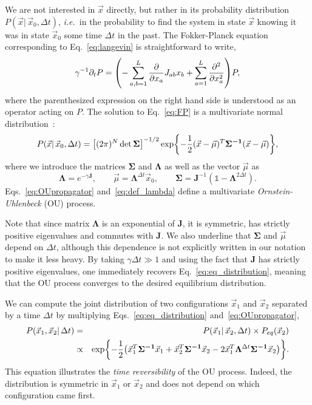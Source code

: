 \documentclass[preprint,amsmath,amssymb,superscriptaddress,showpacs,pre]{revtex4-1}
\let\originalleft\left
\let\originalright\right
\renewcommand{\left}{\mathopen{}\mathclose\bgroup\originalleft}
\renewcommand{\right}{\aftergroup\egroup\originalright}
\newcommand{\ie}{\emph{i.e.}}
\def\vx{\vec x}
\newcommand{\Lam}{\bm{\Lambda}}
\newcommand{\Sig}{\bm{\Sigma}}
\newcommand{\curlynormalpar}[1]{\exp\left\{-\frac{1}{2}\left( #1 \right)\right\}}
\newcommand{\curlynormal}[1]{\exp\left\{-\frac{1}{2} #1 \right\}}
\newcommand{\iSig}{\bm{\Sigma^{-1}}}
\begin{document}
We are not interested in $\vx$ directly, but rather in its probability distribution $P(\vx\vert\,\vx_0,\Delta t)$, \ie~in the probability to find the system in state $\vx$ knowing it was in state $\vx_0$ some time $\Delta t$ in the past. 
The Fokker-Planck equation corresponding to Eq.~\eqref{eq:langevin} is straightforward to write, 
\begin{equation}
	\gamma^{-1} \partial_t P = \left(-\sum_{a,b=1}^L\frac{\partial}{\partial x_a} J_{ab}x_b + \sum_{a=1}^L\frac{\partial^2}{\partial x_a^2}\right) P, 
	\label{eq:FP}
\end{equation}
where the parenthesized expression on the right hand side is understood as an operator acting on $P$. 
The solution to Eq.~\eqref{eq:FP} is a multivariate normal distribution~\cite{singh2017multiOU}:
\begin{equation}
	P(\vx|\, \vx_0, \Delta t) = \left[(2\pi)^N\det\Sig\right]^{-1/2}
	\curlynormal{(\vx-\vec{\mu})^T\iSig(\vx- \vec{\mu})},
	\label{eq:OUpropagator}
\end{equation}
where we introduce the matrices $\Sig$ and $\Lam$ as well as the vector $\vec{\mu}$ as 
\begin{equation}
	\Lam = e^{-\gamma\bm{J}}, \qquad \vec{\mu} = \Lam^{\Delta t} \vx_0, \qquad \Sig = \bm{J}^{-1}(\mathbb{1} - \Lam^{2 \Delta t}).
	\label{eq:def_lambda}
\end{equation}
Eqs.~\eqref{eq:OUpropagator} and~\eqref{eq:def_lambda} define a multivariate \emph{Ornstein-Uhlenbeck} (OU) process. 

Note that since matrix $\Lam$ is an exponential of $\bm{J}$, it is symmetric, has strictly positive eigenvalues and commutes with $\bm{J}$. 
We also underline that $\Sig$ and $\vec{\mu}$ depend on $\Delta t$, although this dependence is not explicitly written in our notation to make it less heavy. 
By taking $\gamma\Delta t \gg 1$ and using the fact that $\bm{J}$ has strictly positive eigenvalues, one immediately recovers Eq.~\eqref{eq:eq_distribution}, meaning that the OU process converges to the desired equilibrium distribution.

We can compute the joint distribution of two configurations $\vx_1$ and $\vx_2$ separated by a time $\Delta t$ by multiplying Eqs.~\eqref{eq:eq_distribution} and~\eqref{eq:OUpropagator}, 
\begin{eqnarray}
    P(\vx_1, \vx_2\vert\,\Delta t) &= & P(\vx_1 |\, \vx_2,\Delta t) \times P_{eq}(\vx_2)
    \nonumber\\
    &\propto& \curlynormalpar{\vx_1^T\iSig\vx_1 + \vx_2^T\iSig\vx_2 - 2\vx_1^T\Lam^{\Delta t}\iSig\vx_2}. 
	\label{eq:OUjoint}	
\end{eqnarray}
This equation illustrates the \emph{time reversibility} of the OU process. 
Indeed, the distribution is symmetric in $\vx_1$ or $\vx_2$ and does not depend on which configuration came first.
\end{document}

